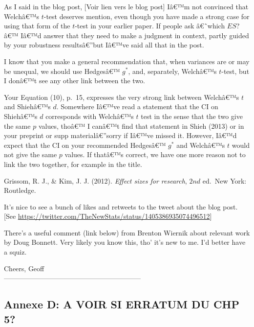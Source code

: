 \begin{appendix}
\color{brown} As I said in the blog post, \color{darkgray} {[}Voir lien
vers le blog post{]} \color{brown} Iâ€™m not convinced that Welchâ€™s
\(t\)-test deserves mention, even though you have made a strong case for
using that form of the \(t\)-test in your earlier paper. If people ask
â€˜which \(ES\)?â€™ Iâ€™d answer that they need to make a judgment in
context, partly guided by your robustness resultsâ€''but Iâ€™ve said all
that in the post.

I know that you make a general recommendation that, when variances are
or may be unequal, we should use Hedgesâ€™ \(g^*\), and, separately,
Welchâ€™s \(t\)-test, but I donâ€™t see any other link between the two.

Your Equation (10), p.~15, expresses the very strong link between
Welchâ€™s \(t\) and Shiehâ€™s \(d\). Somewhere Iâ€™ve read a statement
that the CI on Shiehâ€™s \(d\) corresponds with Welchâ€™s \(t\) test in
the sense that the two give the same \(p\) values, thoâ€™ I canâ€™t find
that statement in Shieh (2013) or in your preprint or supp
materialâ€''sorry if Iâ€™ve missed it. However, Iâ€™d expect that the CI
on your recommended Hedgesâ€™ \(g^*\) and Welchâ€™s \(t\) would not give
the same \(p\) values. If thatâ€™s correct, we have one more reason not
to link the two together, for example in the title.

\color{black} Grissom, R. J., \& Kim, J. J. (2012). \emph{Effect sizes
for research}, \(2{nd}\) ed.~New York: Routledge.

\color{brown} It's nice to see a bunch of likes and retweets to the
tweet about the blog post. \color{darkgray} {[}See
\underline{https://twitter.com/TheNewStats/status/1405386935074496512}{]}

\color{brown} There's a useful comment (link below) from Brenton Wiernik
about relevant work by Doug Bonnett. Very likely you know this, tho'
it's new to me. I'd better have a squiz.

Cheers, Geoff\\
\color{black}
------------------------------------------------------------

\newpage

\hypertarget{annexe-d-a-voir-si-erratum-du-chp-5}{%
\subsection{Annexe D: A VOIR SI ERRATUM DU CHP
5?}\label{annexe-d-a-voir-si-erratum-du-chp-5}}
\end{appendix}
